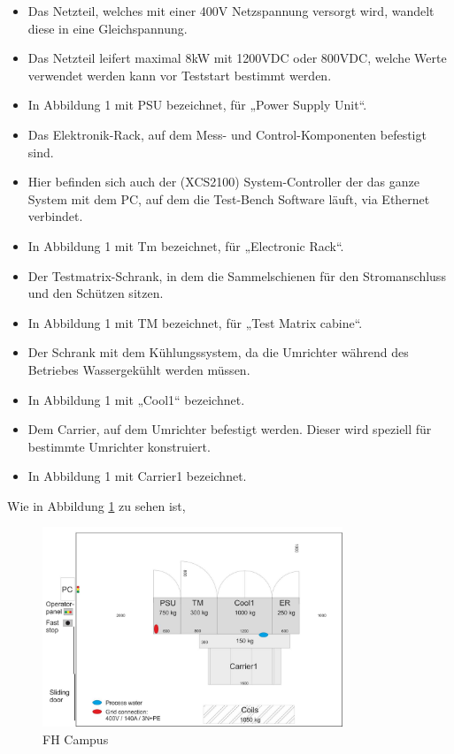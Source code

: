 \begin{itemize}
\item Das Netzteil, welches mit einer 400V Netzspannung versorgt wird, wandelt diese in eine Gleichspannung.
\item Das Netzteil leifert maximal 8kW mit 1200VDC oder 800VDC, welche Werte verwendet werden kann vor Teststart bestimmt werden.
\item In Abbildung 1 mit PSU bezeichnet, für „Power Supply Unit“.


\item Das Elektronik-Rack, auf dem Mess- und Control-Komponenten befestigt sind.
\item Hier befinden sich auch der (XCS2100) System-Controller der das ganze System mit dem PC, auf dem die Test-Bench Software läuft, via Ethernet verbindet.
\item In Abbildung 1 mit Tm bezeichnet, für „Electronic Rack“.


\item Der Testmatrix-Schrank, in dem die Sammelschienen für den Stromanschluss und den Schützen sitzen.
\item In Abbildung 1 mit TM bezeichnet, für „Test Matrix cabine“.


\item Der Schrank mit dem Kühlungssystem, da die Umrichter während des Betriebes Wassergekühlt werden müssen.
\item In Abbildung 1 mit „Cool1“ bezeichnet.


\item Dem Carrier, auf dem Umrichter befestigt werden. Dieser wird speziell für bestimmte Umrichter konstruiert.
\item In Abbildung 1 mit Carrier1 bezeichnet.

\end{itemize}

Wie in Abbildung \ref{fig:campus} zu sehen ist,

\begin{figure}[h]
    \centering
    \includegraphics[width=0.8\textwidth]{Grafiken/Test Cabin.jpg}
    \caption{FH Campus}
    \label{fig:campus}
\end{figure}

